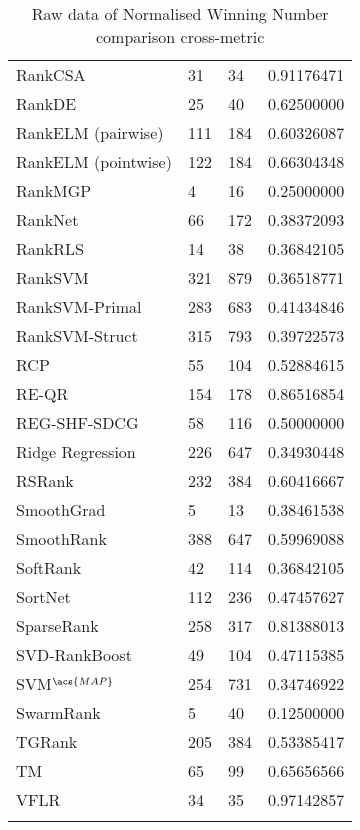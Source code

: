 \begin{longtable}{l|l|l|l}
RankCSA & 31 & 34 & 0.91176471 \\ 
RankDE & 25 & 40 & 0.62500000 \\ 
RankELM (pairwise) & 111 & 184 & 0.60326087 \\ 
RankELM (pointwise) & 122 & 184 & 0.66304348 \\ 
RankMGP & 4 & 16 & 0.25000000 \\ 
RankNet & 66 & 172 & 0.38372093 \\ 
Rank\acs{RLS} & 14 & 38 & 0.36842105 \\ 
Rank\acs{SVM} & 321 & 879 & 0.36518771 \\ 
Rank\acs{SVM}-Primal & 283 & 683 & 0.41434846 \\ 
Rank\acs{SVM}-Struct & 315 & 793 & 0.39722573 \\ 
RCP & 55 & 104 & 0.52884615 \\ 
RE-QR & 154 & 178 & 0.86516854 \\ 
REG-SHF-SDCG & 58 & 116 & 0.50000000 \\ 
Ridge Regression & 226 & 647 & 0.34930448 \\ 
RSRank & 232 & 384 & 0.60416667 \\ 
SmoothGrad & 5 & 13 & 0.38461538 \\ 
SmoothRank & 388 & 647 & 0.59969088 \\ 
SoftRank & 42 & 114 & 0.36842105 \\ 
SortNet & 112 & 236 & 0.47457627 \\ 
SparseRank & 258 & 317 & 0.81388013 \\ 
\acs{SVD}-RankBoost & 49 & 104 & 0.47115385 \\ 
\acs{SVM}$^{\acs{MAP}}$ & 254 & 731 & 0.34746922 \\ 
SwarmRank & 5 & 40 & 0.12500000 \\ 
TGRank & 205 & 384 & 0.53385417 \\ 
TM & 65 & 99 & 0.65656566 \\ 
VFLR & 34 & 35 & 0.97142857 \\
\caption{Raw data of Normalised Winning Number comparison cross-metric}
\label{tab:raw_data_norm_winnum}
\end{longtable}
